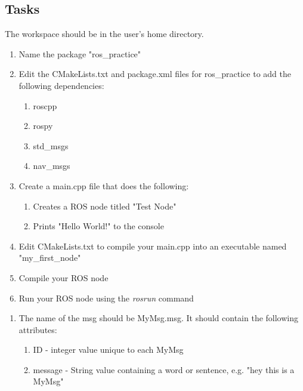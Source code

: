 \documentclass[12pt]{article}
\newenvironment{task}[2][Task]{\begin{trivlist}
\item[\hskip \labelsep {\bfseries #1}\hskip \labelsep {\bfseries #2.}]}{\end{trivlist}}
\begin{document}
\subsection*{Tasks}

\begin{task}{1. Create a ROS workspace}
\end{task}
The workspace should be in the user's home directory.


\begin{task}{2. Create a ROS package in your ROS workspace}
\end{task}

\begin{enumerate}
\item Name the package "ros\_practice"
\item Edit the CMakeLists.txt and package.xml files for ros\_practice to add the following dependencies:
\begin{enumerate}
\item roscpp
\item rospy
\item std\_msgs
\item nav\_msgs
\end{enumerate}

\item Create a main.cpp file that does the following:
\begin{enumerate}
\item Creates a ROS node titled "Test Node"
\item Prints "Hello World!" to the console
\end{enumerate}

\item Edit CMakeLists.txt to compile your main.cpp into an executable named "my\_first\_node"

\item Compile your ROS node
\item Run your ROS node using the \emph{rosrun} command
\end{enumerate}


\begin{task}
{3. Create a custom msg in your ROS package}
\end{task}
\begin{enumerate}
\item The name of the msg should be MyMsg.msg. It should contain the following attributes:
	\begin{enumerate}
	\item ID - integer value unique to each MyMsg
	\item message - String value containing a word or sentence, e.g. "hey this is a MyMsg"
	\end{enumerate}
\end{enumerate}
\end{document}

